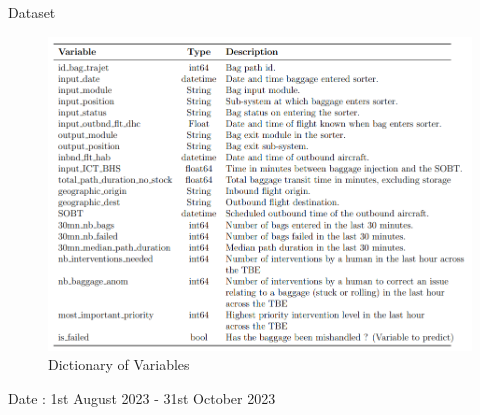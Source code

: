 \documentclass{beamer}
\begin{document}
\begin{frame}{Dataset}

\begin{figure}
        \includegraphics[width=0.7\linewidth]{data table.png}
        \caption{Dictionary of Variables}
\end{figure}

\centering
Date : 1st August 2023 - 31st October 2023

\end{frame}
\end{document}
